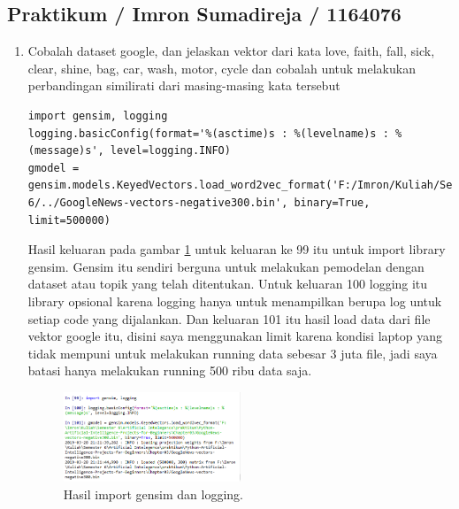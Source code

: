 \subsection{Praktikum / Imron Sumadireja / 1164076}
\begin{enumerate}
\item Cobalah dataset google, dan jelaskan vektor dari kata love, faith, fall, sick, clear, shine, bag, car, wash, motor, cycle dan cobalah untuk melakukan perbandingan similirati dari masing-masing kata tersebut \par
\begin{verbatim}
import gensim, logging
logging.basicConfig(format='%(asctime)s : %(levelname)s : %(message)s', level=logging.INFO)
gmodel = gensim.models.KeyedVectors.load_word2vec_format('F:/Imron/Kuliah/Semester 6/../GoogleNews-vectors-negative300.bin', binary=True, limit=500000)
\end{verbatim}
Hasil keluaran pada gambar \ref{sim1} untuk keluaran ke 99 itu untuk import library gensim. Gensim itu sendiri berguna untuk melakukan pemodelan dengan dataset atau topik yang telah ditentukan. Untuk keluaran 100 logging itu library opsional karena logging hanya untuk menampilkan berupa log untuk setiap code yang dijalankan. Dan keluaran 101 itu hasil load data dari file vektor google itu, disini saya menggunakan limit karena kondisi laptop yang tidak mempuni untuk melakukan running data sebesar 3 juta file, jadi saya batasi hanya melakukan running 500 ribu data saja.
		\begin{figure}[!htbp]
		\centerline{\includegraphics[width=0.5\textwidth]{figures/im/sim1.png}}
		\caption{Hasil import gensim dan logging.}
		\label{sim1}
		\end{figure}


\end{enumerate}
